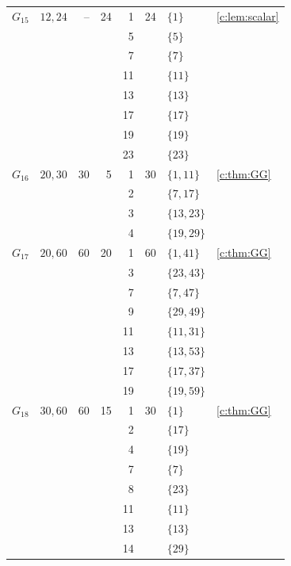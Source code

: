 \documentclass[11pt]{amsart}
\theoremstyle{definition}
\begin{document}
\begin{longtable}{@{}lL{.24\textwidth}rrrrL{.26\textwidth}L{.14\textwidth}@{}}
$G_{15}$ & $12,\allowbreak 24$ & -- & 24 & 1 & 24 & $\{1\}$ & \cref{c:lem:scalar} \\*
 &  &  &  & 5 &  & $\{5\}$ &  \\*
 &  &  &  & 7 &  & $\{7\}$ &  \\*
 &  &  &  & 11 &  & $\{11\}$ &  \\*
 &  &  &  & 13 &  & $\{13\}$ &  \\*
 &  &  &  & 17 &  & $\{17\}$ &  \\*
 &  &  &  & 19 &  & $\{19\}$ &  \\*
 &  &  &  & 23 &  & $\{23\}$ &  \\
\midrule[.25pt]
$G_{16}$ & $20,\allowbreak 30$ & 30 & 5 & 1 & 30 & $\{1,\allowbreak 11\}$ & \cref{c:thm:GG} \\*
 &  &  &  & 2 &  & $\{7,\allowbreak 17\}$ &  \\*
 &  &  &  & 3 &  & $\{13,\allowbreak 23\}$ &  \\*
 &  &  &  & 4 &  & $\{19,\allowbreak 29\}$ &  \\
\midrule[.25pt]
$G_{17}$ & $20,\allowbreak 60$ & 60 & 20 & 1 & 60 & $\{1,\allowbreak 41\}$ & \cref{c:thm:GG} \\*
 &  &  &  & 3 &  & $\{23,\allowbreak 43\}$ &  \\*
 &  &  &  & 7 &  & $\{7,\allowbreak 47\}$ &  \\*
 &  &  &  & 9 &  & $\{29,\allowbreak 49\}$ &  \\*
 &  &  &  & 11 &  & $\{11,\allowbreak 31\}$ &  \\*
 &  &  &  & 13 &  & $\{13,\allowbreak 53\}$ &  \\*
 &  &  &  & 17 &  & $\{17,\allowbreak 37\}$ &  \\*
 &  &  &  & 19 &  & $\{19,\allowbreak 59\}$ &  \\
\midrule[.25pt]
$G_{18}$ & $30,\allowbreak 60$ & 60 & 15 & 1 & 30 & $\{1\}$ & \cref{c:thm:GG} \\*
 &  &  &  & 2 &  & $\{17\}$ &  \\*
 &  &  &  & 4 &  & $\{19\}$ &  \\*
 &  &  &  & 7 &  & $\{7\}$ &  \\*
 &  &  &  & 8 &  & $\{23\}$ &  \\*
 &  &  &  & 11 &  & $\{11\}$ &  \\*
 &  &  &  & 13 &  & $\{13\}$ &  \\*
 &  &  &  & 14 &  & $\{29\}$ &  \\

\end{longtable}
\end{document}
